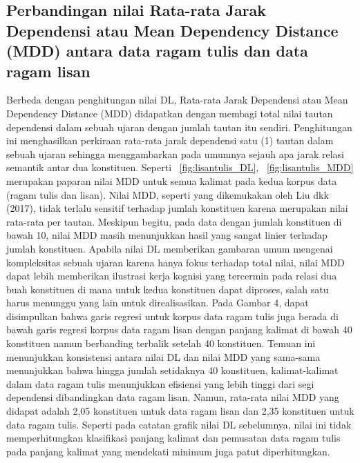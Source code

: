 \subsection{Perbandingan nilai Rata-rata Jarak Dependensi atau Mean Dependency Distance (MDD) antara data ragam tulis dan data ragam lisan}
Berbeda dengan penghitungan nilai DL, Rata-rata Jarak Dependensi atau Mean Dependency Distance (MDD) didapatkan dengan membagi total nilai tautan dependensi dalam sebuah ujaran dengan jumlah tautan itu sendiri. Penghitungan ini menghasilkan perkiraan rata-rata jarak dependensi satu (1) tautan dalam sebuah ujaran sehingga menggambarkan pada umumnya sejauh apa jarak relasi semantik antar dua konstituen. Seperti \pic~\ref{fig:lisantulis_DL}, \pic~\ref{fig:lisantulis_MDD} merupakan paparan nilai MDD untuk semua kalimat pada kedua korpus data (ragam tulis dan lisan). Nilai MDD, seperti yang dikemukakan oleh Liu dkk (2017), tidak terlalu sensitif terhadap jumlah konstituen karena merupakan nilai rata-rata per tautan. Meskipun begitu, pada data dengan jumlah konstituen di bawah 10, nilai MDD masih menunjukkan hasil yang sangat linier terhadap jumlah konstituen. Apabila nilai DL memberikan gambaran umum mengenai kompleksitas sebuah ujaran karena hanya fokus terhadap total nilai, nilai MDD dapat lebih memberikan ilustrasi kerja kognisi yang tercermin pada relasi dua buah konstituen di mana untuk kedua konstituen dapat diproses, salah satu harus menunggu yang lain untuk direalisasikan. Pada Gambar 4, dapat disimpulkan bahwa garis regresi untuk korpus data ragam tulis juga berada di bawah garis regresi korpus data ragam lisan dengan panjang kalimat di bawah 40 konstituen namun berbanding terbalik setelah 40 konstituen. Temuan ini menunjukkan konsistensi antara nilai DL dan nilai MDD yang sama-sama menunjukkan bahwa hingga jumlah setidaknya 40 konstituen, kalimat-kalimat dalam data ragam tulis menunjukkan efisiensi yang lebih tinggi dari segi dependensi dibandingkan data ragam lisan. Namun, rata-rata nilai MDD yang didapat adalah 2,05 konstituen untuk data ragam lisan dan 2,35 konstituen untuk data ragam tulis. Seperti pada catatan grafik nilai DL sebelumnya, nilai ini tidak memperhitungkan klasifikasi panjang kalimat dan pemusatan data ragam tulis pada panjang kalimat yang mendekati minimum juga patut diperhitungkan.

